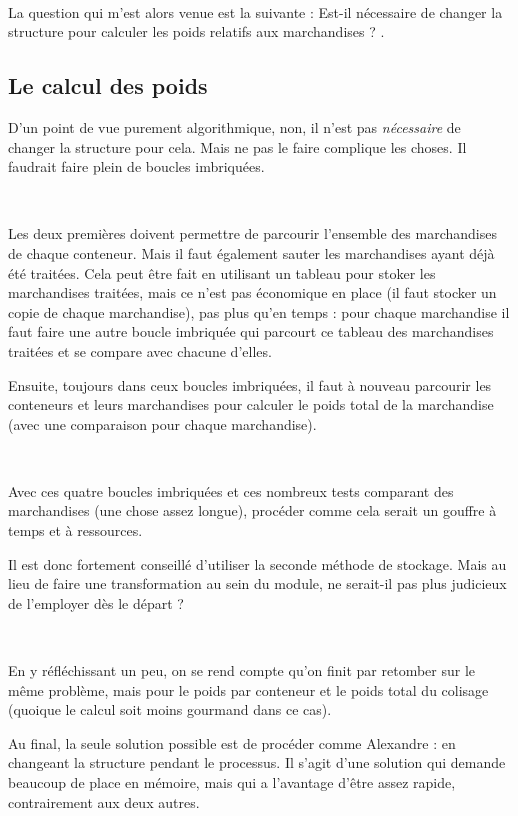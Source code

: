 ~

La question qui m'est alors venue est la suivante : \og Est-il nécessaire de changer la structure pour calculer les poids relatifs aux marchandises ? \fg.


\subsection{Le calcul des poids}
D'un point de vue purement algorithmique, non, il n'est pas \emph{nécessaire} de changer la structure pour cela. Mais ne pas le faire complique les choses. Il faudrait faire plein de boucles imbriquées.

~

Les deux premières doivent permettre de parcourir l'ensemble des marchandises de chaque conteneur. Mais il faut également sauter les marchandises ayant déjà été traitées. Cela peut être fait en utilisant un tableau pour stoker les marchandises traitées, mais ce n'est pas économique en place (il faut stocker un copie de chaque marchandise), pas plus qu'en temps : pour chaque marchandise il faut faire une autre boucle imbriquée qui parcourt ce tableau des marchandises traitées et se compare avec chacune d'elles.

Ensuite, toujours dans ceux boucles imbriquées, il faut à nouveau parcourir les conteneurs et leurs marchandises pour calculer le poids total de la marchandise (avec une comparaison pour chaque marchandise).

~

Avec ces quatre boucles imbriquées et ces nombreux tests comparant des marchandises (une chose assez longue), procéder comme cela serait un gouffre à temps et à ressources.

Il est donc fortement conseillé d'utiliser la seconde méthode de stockage. Mais au lieu de faire une transformation au sein du module, ne serait-il pas plus judicieux de l'employer dès le départ ?

~

En y réfléchissant un peu, on se rend compte qu'on finit par retomber sur le même problème, mais pour le poids par conteneur et le poids total du colisage (quoique le calcul soit moins gourmand dans ce cas).

Au final, la seule solution possible est de procéder comme Alexandre : en changeant la structure pendant le processus. Il s'agit d'une solution qui demande beaucoup de place en mémoire, mais qui a l'avantage d'être assez rapide, contrairement aux deux autres.
